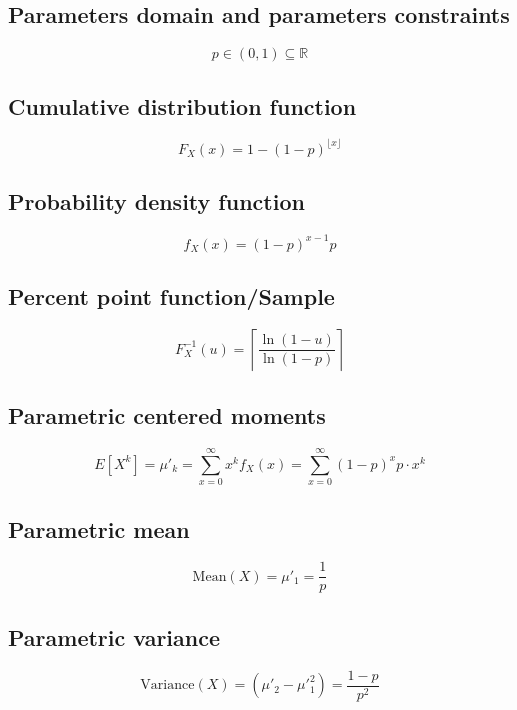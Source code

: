 \documentclass{article}
\begin{document}
\subsection{Parameters domain and parameters constraints}
\begin{equation*} p\in\left(0,1\right)\subseteq\mathbb{R} \end{equation*}
\subsection{Cumulative distribution function}
\begin{equation*} F_{X}\left(x\right)=1-(1 - p)^{\lfloor x\rfloor} \end{equation*}
\subsection{Probability density function}
\begin{equation*} f_{X}\left(x\right)=(1 - p)^{x-1}p \end{equation*}
\subsection{Percent point function/Sample}
\begin{equation*} F^{-1}_{X}\left(u\right)=\left\lceil{\frac{\ln{(1-u)}}{\ln{(1-p)}}}\right\rceil \end{equation*}
\subsection{Parametric centered moments}
\begin{equation*} E[X^k]=\mu'_{k}=\sum_{x=0}^{\infty}x^{k}f_{X}\left(x\right)=\sum_{x=0}^\infty (1-p)^x p\cdot x^k \end{equation*}
\subsection{Parametric mean}
\begin{equation*} \mathrm{Mean}(X)=\mu'_{1}=\frac{1}{p} \end{equation*}
\subsection{Parametric variance}
\begin{equation*} \mathrm{Variance}(X)=(\mu'_{2}-\mu'^{2}_{1})=\frac{1-p}{p^2} \end{equation*}
\end{document}
